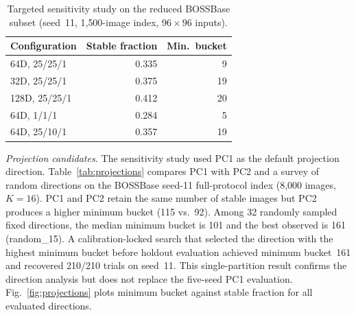 ﻿\documentclass[10pt,journal]{IEEEtran}
\begin{document}
\begin{table}[t]
\centering
\caption{Targeted sensitivity study on the reduced BOSSBase subset
  (seed~11, 1{,}500-image index, $96\times96$ inputs).}
\label{tab:sensitivity}
\small
\begin{tabular}{lrr}
\toprule
Configuration & Stable fraction & Min.\ bucket\\
\midrule
64D, 25/25/1  & 0.335 & 9\\
32D, 25/25/1  & 0.375 & 19\\
128D, 25/25/1 & 0.412 & 20\\
64D, 1/1/1    & 0.284 & 5\\
64D, 25/10/1  & 0.357 & 19\\
\bottomrule
\end{tabular}
\end{table}

\textit{Projection candidates.}
The sensitivity study used PC1 as the default projection direction.
Table~\ref{tab:projections} compares PC1 with PC2 and a survey of
random directions on the BOSSBase seed-11 full-protocol index
(8{,}000 images, $K{=}16$). PC1 and PC2 retain the same number of
stable images but PC2 produces a higher minimum bucket (115 vs.\ 92).
Among 32 randomly sampled fixed directions, the median minimum bucket
is 101 and the best observed is 161 (random\_15). A calibration-locked
search that selected the direction with the highest minimum bucket
before holdout evaluation achieved minimum bucket~161 and recovered
210/210 trials on seed~11. This single-partition result confirms the
direction analysis but does not replace the five-seed PC1 evaluation.
Fig.~\ref{fig:projections} plots minimum bucket against stable
fraction for all evaluated directions.

\begin{table}[t]
\centering
\caption{Projection candidates on BOSSBase seed-11 ($K{=}16$,
  8{,}000-image index). PC1 and PC2 retain the same stable images
  (2{,}823) but differ in bucket balance. The calibration-locked
  random direction (best of 32 trials) achieves the highest minimum
  bucket.}
\label{tab:projections}
\footnotesize
{}
\end{table}
\end{document}
